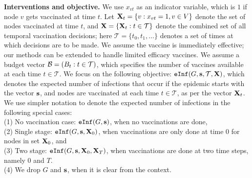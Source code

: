 \noindent
\textbf{Interventions and objective.}
We use $x_{vt}$ as an indicator variable, which is $1$ if node $v$ gets vaccinated at time $t$.
Let $\mathbf{X}_t=\{v: x_{vt}=1, v\in V\}$ denote the set of nodes vaccinated at time $t$, and 
$\mathbf{X}=\{\mathbf{X}_t: t\in\mathcal{T}\}$ denote the combined set of all temporal vaccination
decisions; here $\mathcal{T}=\{t_0, t_1,\ldots\}$ denotes a set of times at which decisions are to be made.
We assume the vaccine is immediately effective; our methods can be extended to handle limited efficacy vaccines.
We assume a budget vector $\mathcal{B}=(B_t: t\in\mathcal{T})$, which specifies the number of vaccines available
at each time $t\in\mathcal{T}$. We focus on the following objective:
$\texttt{eInf}(G, \mathbf{s}, \mathcal{T}, \mathbf{X})$, which denotes the expected number of infections that occur if the epidemic
starts with the vector $\mathbf{s}$, and nodes are vaccinated at each time $t\in\mathcal{T}$, as per the vector $\mathbf{X}_t$.
We use simpler notation to denote the expected number of infections in the following special cases:\\
(1) No vaccination case: $\texttt{eInf}(G, \mathbf{s})$, when no vaccinations are done,\\
(2) Single stage: $\texttt{eInf}(G, \mathbf{s}, \mathbf{X}_0)$, when vaccinations are only done at time 0 for nodes in set $\mathbf{X}_0$, and\\
(3) Two stage: $\texttt{eInf}(G, \mathbf{s}, \mathbf{X}_0, \mathbf{X}_T)$, when vaccinations are done at two time steps,
namely $0$ and $T$.\\
(4) We drop $G$ and $\mathbf{s}$, when it is clear from the context.

